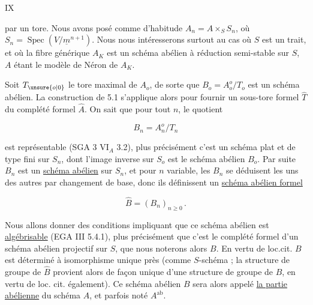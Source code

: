 \hfill IX

par un tore. Nous avons posé comme d'habitude $A_n=A\times_S S_n$, où $S_n=\operatorname{Spec}(V/\underline m^{n+1})$. Nous nous intéresserons surtout au cas où $S$ est un trait, et où la fibre générique $A_K$ est un schéma abélien à réduction semi-stable sur $S$, $A$ étant le modèle de Néron de $A_K$.

Soit $T_{\unsure{o|0}}$ le tore maximal de $A_o$, de sorte que $B_o=A_o^o/T_o$ est un schéma abélien. La construction de 5.1 s'applique alors pour fournir un sous-tore formel $\hat T$ du complété formel $\hat A$. On sait que pour tout $n$, le quotient

\[
B_n=A_n^o/T_n\tag*{(7.1.1)}
\]

est représentable (SGA 3 $\mathrm{VI}_A$ 3.2), plus précisément c'est un schéma plat et de type fini sur $S_n$, dont l'image inverse sur $S_o$ est le schéma abélien $B_o$. Par suite $B_n$ est un \uline{schéma abélien} sur $S_n$, et pour $n$ variable, les $B_n$ se déduisent les uns des autres par changement de base, donc ils définissent un \uline{schéma abélien formel}

\[
\hat B=(B_n)_{n\geq0}\,.\tag*{(7.1.2)}
\]

Nous allons donner des conditions impliquant que ce schéma abélien est \uline{algébrisable} (EGA III 5.4.1), plus précisément que c'est le complété formel d'un schéma abélien projectif sur $S$, que nous noterons alors $B$. En vertu de loc.cit. $B$ est déterminé à isomorphisme unique près (comme $S$-schéma ; la structure de groupe de $\hat B$ provient alors de façon unique d'une structure de groupe de $B$, en vertu de loc. cit. également). Ce schéma abélien $B$ sera alors appelé \uline{la partie abélienne} du schéma $A$, et parfois noté $A^{\mathrm{ab}}$.

